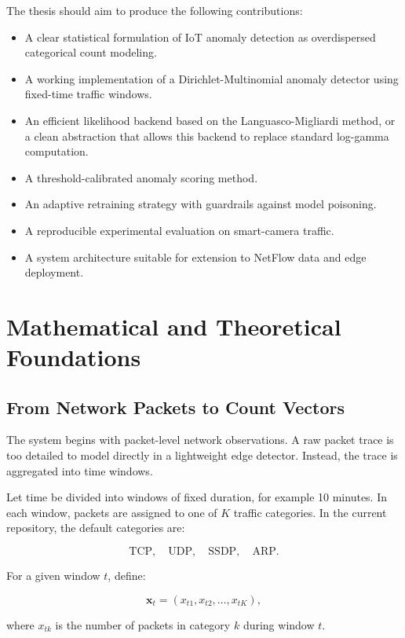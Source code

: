 \documentclass[11pt,a4paper]{article}
\begin{document}
The thesis should aim to produce the following contributions:

\begin{itemize}
  \item A clear statistical formulation of IoT anomaly detection as overdispersed categorical count modeling.
  \item A working implementation of a Dirichlet-Multinomial anomaly detector using fixed-time traffic windows.
  \item An efficient likelihood backend based on the Languasco-Migliardi method, or a clean abstraction that allows this backend to replace standard log-gamma computation.
  \item A threshold-calibrated anomaly scoring method.
  \item An adaptive retraining strategy with guardrails against model poisoning.
  \item A reproducible experimental evaluation on smart-camera traffic.
  \item A system architecture suitable for extension to NetFlow data and edge deployment.
\end{itemize}

\section{Mathematical and Theoretical Foundations}

\subsection{From Network Packets to Count Vectors}

The system begins with packet-level network observations. A raw packet trace is too detailed to model directly in a lightweight edge detector. Instead, the trace is aggregated into time windows.

Let time be divided into windows of fixed duration, for example 10 minutes. In each window, packets are assigned to one of \(K\) traffic categories. In the current repository, the default categories are:

\[
\mathrm{TCP},\quad \mathrm{UDP},\quad \mathrm{SSDP},\quad \mathrm{ARP}.
\]

For a given window \(t\), define:

\[
\mathbf{x}_t = \left(x_{t1}, x_{t2}, \ldots, x_{tK}\right),
\]

where \(x_{tk}\) is the number of packets in category \(k\) during window \(t\).
\end{document}
